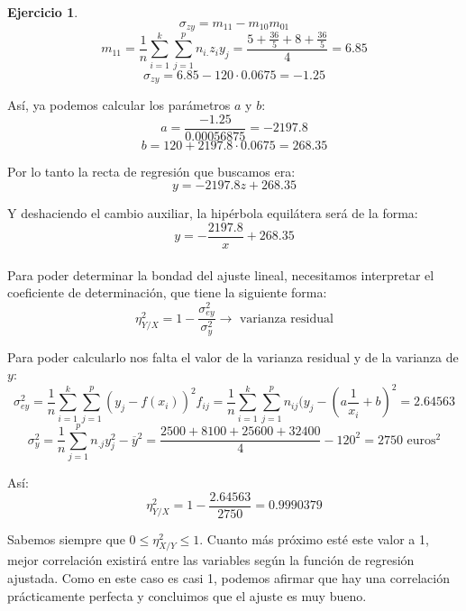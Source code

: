 \documentclass[a4paper, 12pt]{article}
\theoremstyle{definition}
\newtheorem{ej}{Ejercicio}
\begin{document}
\begin{ej}
\[
	\sigma_{zy} = m_{11} - m_{10} m_{01} 
\]
\[
	m_{11} = \frac{1}{n} \sum_{i=1}^{k} \sum_{j=1}^{p} n_{i.} z_i y_j = \frac{5 + \frac{36}{5} + 8 + \frac{36}{5}}{4} = 6.85
\]
\[
	\sigma_{zy} = 6.85 - 120 \cdot 0.0675 = -1.25
\]

Así, ya podemos calcular los parámetros \(a\) y \(b\):
\[
	a = \frac{-1.25}{0.00056875} = -2197.8
\]
\[
	b = 120 + 2197.8 \cdot 0.0675 = 268.35
\]

Por lo tanto la recta de regresión que buscamos era:
\[
	y = -2197.8z + 268.35
\]

Y deshaciendo el cambio auxiliar, la hipérbola equilátera será de la forma:
\[
	y = - \frac{2197.8}{x} + 268.35
\] \\

Para poder determinar la bondad del ajuste lineal, necesitamos interpretar el coeficiente de determinación, que tiene la siguiente forma:
\[
	\eta_{Y/X}^2 = 1 - \frac{\sigma_{ey}^2}{\sigma_y^2} \rightarrow \text{ varianza residual}
\]

Para poder calcularlo nos falta el valor de la varianza residual y de la varianza de \(y\):
\[
	\sigma_{ey}^2 = \frac{1}{n} \sum_{i=1}^{k} \sum_{j=1}^{p} (y_j - f(x_i))^2 f_{ij} = \frac{1}{n} \sum_{i=1}^{k} \sum_{j=1}^{p} n_{ij} (y_j - (a \frac{1}{x_i} + b)^2 = 2.64563
\]
\[
	\sigma_y^2 = \frac{1}{n} \sum_{j=1}^{p} n_{.j} y_j^2 - \overline{y}^2 = \frac{2500+8100+25600+32400}{4} - 120^2 = 2750 \text{ euros}^2
\]

Así:
\[
	\eta_{Y/X}^2 = 1 - \frac{2.64563}{2750} = 0.9990379
\]

Sabemos siempre que \(0 \leq \eta_{X/Y}^2 \leq 1\). Cuanto más próximo esté este valor a 1, mejor correlación existirá entre las variables según la función de regresión ajustada. Como en este caso es casi 1, podemos afirmar que hay una correlación prácticamente perfecta y concluimos que el ajuste es muy bueno.
\end{ej}
\end{document}

